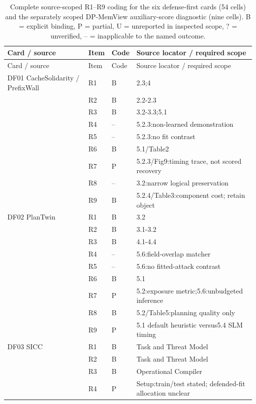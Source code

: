 \begin{longtable}{@{}p{}p{}p{}p{}@{}}
\caption{Complete source-scoped R1--R9 coding for the six defense-first cards (54 cells) and the separately scoped DP-MemView auxiliary-score diagnostic (nine cells). B = explicit binding, P = partial, U = unreported in inspected scope, ? = unverified, -- = inapplicable to the named outcome.}\label{tab:r42-defense-first-audit}\\
\toprule Card / source & Item & Code & Source locator / required scope\\\midrule\endfirsthead
\toprule Card / source & Item & Code & Source locator / required scope\\\midrule\endhead
DF01 CacheSolidarity / PrefixWall~\cite{pennas2026cachesolidarity} & R1 & B & 2.3;4\\
 & R2 & B & 2.2-2.3\\
 & R3 & B & 3.2-3.3;5.1\\
 & R4 & -- & 5.2.3:non-learned demonstration\\
 & R5 & -- & 5.2.3:no fit contrast\\
 & R6 & B & 5.1/Table2\\
 & R7 & P & 5.2.3/Fig9:timing trace, not scored recovery\\
 & R8 & -- & 3.2:narrow logical preservation\\
 & R9 & B & 5.2.4/Table3:component cost; retain object\\
\addlinespace[1pt]
DF02 PlanTwin~\cite{yu2026plantwin} & R1 & B & 3.2\\
 & R2 & B & 3.1-3.2\\
 & R3 & B & 4.1-4.4\\
 & R4 & -- & 5.6:field-overlap matcher\\
 & R5 & -- & 5.6:no fitted-attack contrast\\
 & R6 & B & 5.1\\
 & R7 & P & 5.2:exposure metric;5.6:unbudgeted inference\\
 & R8 & B & 5.2/Table5:planning quality only\\
 & R9 & P & 5.1 default heuristic versus5.4 SLM timing\\
\addlinespace[1pt]
DF03 SICC~\cite{xu2026sicc} & R1 & B & Task and Threat Model\\
 & R2 & B & Task and Threat Model\\
 & R3 & B & Operational Compiler\\
 & R4 & P & Setup:train/test stated; defended-fit allocation unclear\\

\end{longtable}
